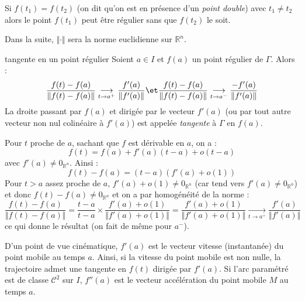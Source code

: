 \documentclass[french,11pt,twoside]{VcCours}
\begin{document}
\begin{Remarque}[\alerte]{}
	Si $f(t_1) = f(t_2)$ (on dit qu'on est en présence d'un \emph{point double}) avec $t_1 \neq t_2$ alors le point $f(t_1)$ peut être régulier sans que $f(t_2)$ le soit.
\end{Remarque}

\medskip

Dans la suite, $\Vert \cdot \Vert$ sera la norme euclidienne sur $\mathbb{R}^n$.

\medskip

\begin{TheoremeDefinition}{tangente en un point régulier}
Soient $a \in I$ et $f(a)$ un point régulier de $\Gamma$. Alors :
$$ \dfrac{f(t)-f(a)}{\Vert f(t)-f(a) \Vert} \underset{t \rightarrow a^+}{\longrightarrow} \frac{f'(a)}{\Vert f'(a) \Vert} \et  \dfrac{f(t)-f(a)}{\Vert f(t)-f(a) \Vert} \underset{t \rightarrow a^-}{\longrightarrow} \frac{-f'(a)}{\Vert f'(a) \Vert}$$
La droite passant par $f(a)$ et dirigée par le vecteur $f'(a)$ (ou par tout autre vecteur non nul colinéaire à $f'(a)$) est appelée \emph{tangente} à $\Gamma$ en $f(a)$.
\end{TheoremeDefinition}

\begin{Demonstration}{} Pour $t$ proche de $a$, sachant que $f$ est dérivable en $a$, on a :
$$ f(t)=f(a)+f'(a)(t-a)+o(t-a)$$
avec $f'(a) \neq 0_{\mathbb{R}^n}$. Ainsi :
$$ f(t)-f(a)= (t-a) (f'(a)+o(1))$$
Pour $t>a$ assez proche de $a$, $f'(a)+o(1) \neq  0_{\mathbb{R}^n}$ (car tend vers $f'(a) \neq  0_{\mathbb{R}^n}$) et donc $f(t)-f(a) \neq  0_{\mathbb{R}^n}$ et on a par homogénéité de la norme :
$$  \dfrac{f(t)-f(a)}{\Vert f(t)-f(a) \Vert} = \frac{t-a}{t-a} \times \frac{f'(a)+o(1)}{\Vert f'(a)+o(1)\Vert} = \frac{f'(a)+o(1)}{\Vert f'(a)+o(1)\Vert} \underset{t \rightarrow  a^+}{\longrightarrow} \frac{f'(a)}{\Vert f'(a) \Vert}$$
ce qui donne le résultat (on fait de même pour $a^{-}$).
\end{Demonstration}

\medskip

\begin{Remarque}{}
D'un point de vue cinématique, $f'(a)$ est le vecteur vitesse (instantanée) du point mobile au temps $a$. Ainsi, si la vitesse du point mobile est non nulle, la trajectoire  admet une tangente en $f(t)$ dirigée par $f'(a)$. Si l'arc paramétré est de classe $\mathcal{C}^2$ sur $I$, $f''(a)$ est le vecteur accélération du point mobile $M$ au temps $a$.
\end{Remarque}
\end{document}
